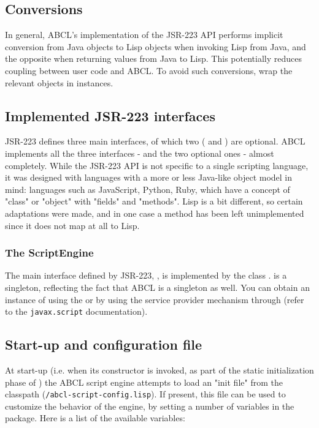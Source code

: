 \documentclass[10pt]{book}
\begin{document}
\subsection{Conversions}

In general, ABCL's implementation of the JSR-223 API performs implicit
conversion from Java objects to Lisp objects when invoking Lisp from
Java, and the opposite when returning values from Java to Lisp. This
potentially reduces coupling between user code and ABCL. To avoid such
conversions, wrap the relevant objects in  instances.

\subsection{Implemented JSR-223 interfaces}

JSR-223 defines three main interfaces, of which two (
and ) are optional. ABCL implements all the three
interfaces -  and the two optional ones - almost
completely. While the JSR-223 API is not specific to a single scripting
language, it was designed with languages with a more or less Java-like
object model in mind: languages such as JavaScript, Python, Ruby, which
have a concept of "class" or "object" with "fields" and "methods". Lisp
is a bit different, so certain adaptations were made, and in one case a
method has been left unimplemented since it does not map at all to Lisp.

\subsubsection{The ScriptEngine}

The main interface defined by JSR-223, ,
is implemented by the class
. 
is a singleton, reflecting the fact that ABCL is a singleton as
well. You can obtain an instance of  using the
 or by using the service provider
mechanism through  (refer to the
\texttt{javax.script} documentation).

\subsection{Start-up and configuration file}

At start-up (i.e. when its constructor is invoked, as part of the
static initialization phase of ) the
ABCL script engine attempts to load an "init file" from the classpath
(\texttt{/abcl-script-config.lisp}). If present, this file can be used
to customize the behavior of the engine, by setting a number of
variables in the  package. Here is a list of the
available variables:
\end{document}
